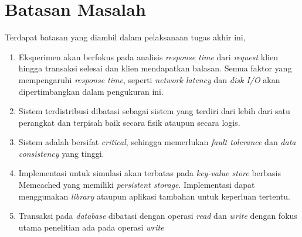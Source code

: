 \section{Batasan Masalah}

Terdapat batasan yang diambil dalam pelaksanaan tugas akhir ini,

\begin{enumerate}
    \item Eksperimen akan berfokus pada analisis \textit{response time} dari \textit{request} klien hingga transaksi selesai dan klien mendapatkan balasan. Semua faktor yang mempengaruhi \textit{response time}, seperti \textit{network latency} dan \textit{disk I/O} akan dipertimbangkan dalam pengukuran ini.
    \item Sistem terdistribusi dibatasi sebagai sistem yang terdiri dari lebih dari satu perangkat dan terpisah baik secara fisik ataupun secara logis.
    \item Sistem adalah bersifat \textit{critical}, sehingga memerlukan \textit{fault tolerance} dan \textit{data consistency} yang tinggi.
    \item Implementasi untuk simulasi akan terbatas pada \textit{key-value store} berbasis Memcached yang memiliki \textit{persistent storage}. Implementasi dapat menggunakan \textit{library} ataupun aplikasi tambahan untuk keperluan tertentu.
    \item Transaksi pada \textit{database} dibatasi dengan operasi \textit{read} dan \textit{write} dengan fokus utama penelitian ada pada operasi \textit{write} 
\end{enumerate}
